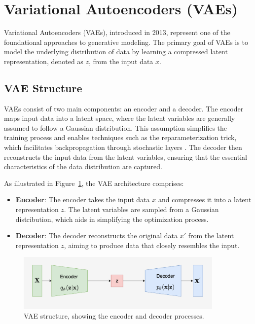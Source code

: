 \section{Variational Autoencoders (VAEs)}

Variational Autoencoders (VAEs), introduced in 2013, represent one of the foundational approaches to generative modeling. The primary goal of VAEs is to model the underlying distribution of data by learning a compressed latent representation, denoted as \(z\), from the input data \(x\).

\subsection{VAE Structure}
VAEs consist of two main components: an encoder and a decoder. The encoder maps input data into a latent space, where the latent variables are generally assumed to follow a Gaussian distribution. This assumption simplifies the training process and enables techniques such as the reparameterization trick, which facilitates backpropagation through stochastic layers \citep{10.1561/2200000056}. The decoder then reconstructs the input data from the latent variables, ensuring that the essential characteristics of the data distribution are captured.

As illustrated in Figure~\ref{fig:VAE_structure}, the VAE architecture comprises:
\begin{itemize}
    \item \textbf{Encoder}: The encoder takes the input data \(x\) and compresses it into a latent representation \(z\). The latent variables are sampled from a Gaussian distribution, which aids in simplifying the optimization process.
    \item \textbf{Decoder}: The decoder reconstructs the original data \(x'\) from the latent representation \(z\), aiming to produce data that closely resembles the input.
\end{itemize}

\begin{figure}[H]
    \centering
    \includegraphics[width=0.9\textwidth]{./Images/VAE_structure.jpg}
    \caption{VAE structure, showing the encoder and decoder processes.}
    \label{fig:VAE_structure}
\end{figure}

